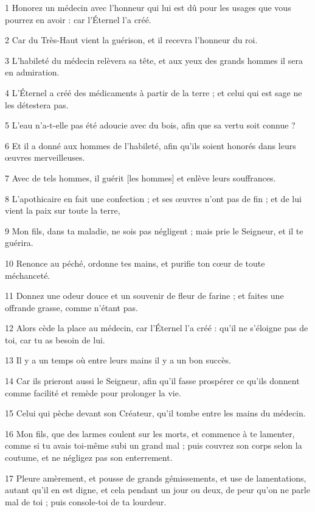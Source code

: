 \par 1 Honorez un médecin avec l'honneur qui lui est dû pour les usages que vous pourrez en avoir : car l'Éternel l'a créé.
\par 2 Car du Très-Haut vient la guérison, et il recevra l'honneur du roi.
\par 3 L'habileté du médecin relèvera sa tête, et aux yeux des grands hommes il sera en admiration.
\par 4 L'Éternel a créé des médicaments à partir de la terre ; et celui qui est sage ne les détestera pas.
\par 5 L'eau n'a-t-elle pas été adoucie avec du bois, afin que sa vertu soit connue ?
\par 6 Et il a donné aux hommes de l'habileté, afin qu'ils soient honorés dans leurs œuvres merveilleuses.
\par 7 Avec de tels hommes, il guérit [les hommes] et enlève leurs souffrances.
\par 8 L'apothicaire en fait une confection ; et ses œuvres n'ont pas de fin ; et de lui vient la paix sur toute la terre,
\par 9 Mon fils, dans ta maladie, ne sois pas négligent ; mais prie le Seigneur, et il te guérira.
\par 10 Renonce au péché, ordonne tes mains, et purifie ton cœur de toute méchanceté.
\par 11 Donnez une odeur douce et un souvenir de fleur de farine ; et faites une offrande grasse, comme n'étant pas.
\par 12 Alors cède la place au médecin, car l'Éternel l'a créé : qu'il ne s'éloigne pas de toi, car tu as besoin de lui.
\par 13 Il y a un temps où entre leurs mains il y a un bon succès.
\par 14 Car ils prieront aussi le Seigneur, afin qu'il fasse prospérer ce qu'ils donnent comme facilité et remède pour prolonger la vie.
\par 15 Celui qui pèche devant son Créateur, qu'il tombe entre les mains du médecin.
\par 16 Mon fils, que des larmes coulent sur les morts, et commence à te lamenter, comme si tu avais toi-même subi un grand mal ; puis couvrez son corps selon la coutume, et ne négligez pas son enterrement.
\par 17 Pleure amèrement, et pousse de grands gémissements, et use de lamentations, autant qu'il en est digne, et cela pendant un jour ou deux, de peur qu'on ne parle mal de toi ; puis console-toi de ta lourdeur.
